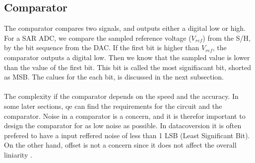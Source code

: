 \documentclass[english, 12pt, a4paper]{ifimaster}
\begin{document}
\subsection{Comparator}
The comparator compares two signals, and outputs either a digital low or high. For a SAR ADC, we compare the sampled reference voltage (\(V_{ref}\)) from the S/H, by the bit sequence from the DAC. 
If the first bit is higher than \(V_{ref}\), the comparator outputs a digital low. Then we know that the sampled value is lower than the value of the first bit. This bit is called the most 
signifiacant bit, shorted as MSB. The calues for the each bit, is discussed in the next subsection.\\
\\
The complexity if the comparator depends on the speed and the accuracy. In some later sections, qe can find the requirements for the circuit and the comparator. Noise in a comparator is a 
concern, and it is therefor important to design the comparator for as low noise as possible. In datacoversion it is often prefered to have a input reffered noise of less than 1 LSB 
(Least Significant Bit). On the other hand, offset is not a concern since it does not affect the overall liniarity \cite{sar-adc-concept}. 
\end{document}
